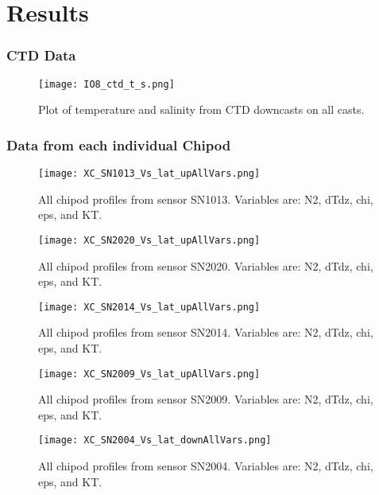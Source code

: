 \documentclass[11pt]{article}
\begin{document}
\newpage 



\section{Results} 

\clearpage 

\subsubsection{CTD Data } 
\begin{figure}[htbp] 
\texttt{[image: IO8\_ctd\_t\_s.png]} 
\caption{Plot of temperature and salinity from CTD downcasts on all casts.} 
\label{} 
\end{figure} 

\clearpage 

\subsubsection{Data from each individual Chipod} 

\begin{figure}[htbp] 
\texttt{[image: XC\_SN1013\_Vs\_lat\_upAllVars.png]} 
\caption{All chipod profiles from sensor SN1013. Variables are: N2, dTdz, chi, eps, and KT.} 
\label{} 
\end{figure} 

\begin{figure}[htbp] 
\texttt{[image: XC\_SN2020\_Vs\_lat\_upAllVars.png]} 
\caption{All chipod profiles from sensor SN2020. Variables are: N2, dTdz, chi, eps, and KT.} 
\label{} 
\end{figure} 

\begin{figure}[htbp] 
\texttt{[image: XC\_SN2014\_Vs\_lat\_upAllVars.png]} 
\caption{All chipod profiles from sensor SN2014. Variables are: N2, dTdz, chi, eps, and KT.} 
\label{} 
\end{figure} 

\begin{figure}[htbp] 
\texttt{[image: XC\_SN2009\_Vs\_lat\_upAllVars.png]} 
\caption{All chipod profiles from sensor SN2009. Variables are: N2, dTdz, chi, eps, and KT.} 
\label{} 
\end{figure} 

\begin{figure}[htbp] 
\texttt{[image: XC\_SN2004\_Vs\_lat\_downAllVars.png]} 
\caption{All chipod profiles from sensor SN2004. Variables are: N2, dTdz, chi, eps, and KT.} 
\label{} 
\end{figure} 
\end{document}
